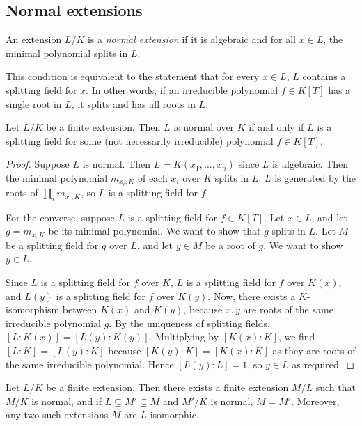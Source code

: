 \subsection{Normal extensions}
\begin{definition}
	An extension \( L / K \) is a \emph{normal extension} if it is algebraic and for all \( x \in L \), the minimal polynomial splits in \( L \).
\end{definition}
\begin{remark}
	This condition is equivalent to the statement that for every \( x \in L \), \( L \) contains a splitting field for \( x \).
	In other words, if an irreducible polynomial \( f \in K[T] \) has a single root in \( L \), it splits and has all roots in \( L \).
\end{remark}
\begin{theorem}
	Let \( L / K \) be a finite extension.
	Then \( L \) is normal over \( K \) if and only if \( L \) is a splitting field for some (not necessarily irreducible) polynomial \( f \in K[T] \).
\end{theorem}
\begin{proof}
	Suppose \( L \) is normal.
	Then \( L = K(x_1, \dots, x_n) \) since \( L \) is algebraic.
	Then the minimal polynomial \( m_{x_i,K} \) of each \( x_i \) over \( K \) splits in \( L \).
	\( L \) is generated by the roots of \( \prod_i m_{x_i,K} \), so \( L \) is a splitting field for \( f \).

	For the converse, suppose \( L \) is a splitting field for \( f \in K[T] \).
	Let \( x \in L \), and let \( g = m_{x,K} \) be its minimal polynomial.
	We want to show that \( g \) splits in \( L \).
	Let \( M \) be a splitting field for \( g \) over \( L \), and let \( y \in M \) be a root of \( g \).
	We want to show \( y \in L \).

	Since \( L \) is a splitting field for \( f \) over \( K \), \( L \) is a splitting field for \( f \) over \( K(x) \), and \( L(y) \) is a splitting field for \( f \) over \( K(y) \).
	Now, there exists a \( K \)-isomorphism between \( K(x) \) and \( K(y) \), because \( x, y \) are roots of the same irreducible polynomial \( g \).
	By the uniqueness of splitting fields, \( [L:K(x)] = [L(y):K(y)] \).
	Multiplying by \( [K(x):K] \), we find \( [L:K] = [L(y):K] \) because \( [K(y):K] = [K(x):K] \) as they are roots of the same irreducible polynomial.
	Hence \( [L(y):L] = 1 \), so \( y \in L \) as required.
\end{proof}
\begin{corollary}
	Let \( L / K \) be a finite extension.
	Then there exists a finite extension \( M / L \) such that \( M / K \) is normal, and if \( L \subseteq M' \subseteq M \) and \( M' / K \) is normal, \( M = M' \).
	Moreover, any two such extensions \( M \) are \( L \)-isomorphic.
\end{corollary}
